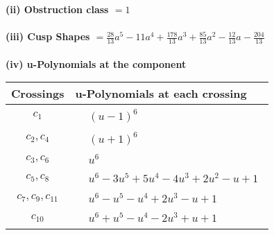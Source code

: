 \documentclass[1p]{elsarticle_modified}
\theoremstyle{definition}
\begin{document}
\flushleft \textbf{(ii) Obstruction class $= 1$}\\~\\
\flushleft \textbf{(iii) Cusp Shapes $= \frac{28}{13} a^5-11 a^4+\frac{178}{13} a^3+\frac{85}{13} a^2-\frac{12}{13} a-\frac{204}{13}$}\\~\\
\newpage\renewcommand{\arraystretch}{1}
\flushleft \textbf{(iv) u-Polynomials at the component}\newline \\
\begin{tabular}{m{50pt}|m{274pt}}
Crossings & \hspace{64pt}u-Polynomials at each crossing \\
\hline $$\begin{aligned}c_{1}\end{aligned}$$&$\begin{aligned}
&(u-1)^6
\end{aligned}$\\
\hline $$\begin{aligned}c_{2},c_{4}\end{aligned}$$&$\begin{aligned}
&(u+1)^6
\end{aligned}$\\
\hline $$\begin{aligned}c_{3},c_{6}\end{aligned}$$&$\begin{aligned}
&u^6
\end{aligned}$\\
\hline $$\begin{aligned}c_{5},c_{8}\end{aligned}$$&$\begin{aligned}
&u^6-3 u^5+5 u^4-4 u^3+2 u^2- u+1
\end{aligned}$\\
\hline $$\begin{aligned}c_{7},c_{9},c_{11}\end{aligned}$$&$\begin{aligned}
&u^6- u^5- u^4+2 u^3- u+1
\end{aligned}$\\
\hline $$\begin{aligned}c_{10}\end{aligned}$$&$\begin{aligned}
&u^6+u^5- u^4-2 u^3+u+1
\end{aligned}$\\
\hline
\end{tabular}\\~\\
\end{document}

